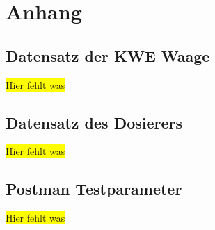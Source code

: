 \chapter{Anhang}
\label{ch:anhang}

\section{Datensatz der KWE Waage}
\label{sec:postmanTestparameter}
\colorbox{yellow}{Hier fehlt was}

\section{Datensatz des Dosierers}
\label{sec:postmanTestparameter}
\colorbox{yellow}{Hier fehlt was}

\section{Postman Testparameter}
\label{sec:postmanTestparameter}
\colorbox{yellow}{Hier fehlt was}